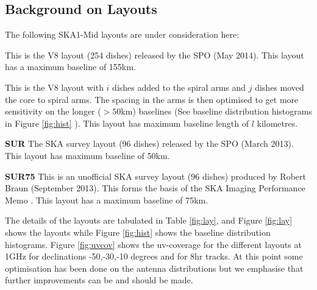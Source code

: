 \documentclass[sfheadings,a4paper,times,9pt,floats,floatfix]{article}
\begin{document}
\subsection{Background on Layouts}\label{sec:layouts}
The following SKA1-Mid layouts are under consideration here:
\begin{description}
\item[{\bf V8B155}] This is the V8 layout (254 dishes) released by the SPO (May 2014). This layout
has a maximum baseline of 155km.
\item[{\bf W8-$i$C$j$B$l$}] This is the V8 layout with $i$ dishes added
to the spiral arms and $j$ dishes moved the core to spiral arms. The spacing in the arms is then optimised  to get
more sensitivity on the longer ($>50$km) baselines (See baseline distribution histograms in Figure \ref{fig:hist} ).
This layout has maximum baseline length of $l$ kilometres.
\item {\bf SUR} The SKA survey layout (96 dishes) released by the SPO (March 2013). This layout
has maximum baseline of 50km. 
\item {\bf SUR75} This is an unofficial SKA survey layout (96 dishes) produced by Robert Braun
(September 2013). This forms the basis of the SKA Imaging Performance Memo \cite{srd}. This layout has a maximum
baseline of 75km.
\end{description}
The details of the layouts are tabulated in Table \ref{fig:lay}, and Figure \ref{fig:lay} shows the layouts while Figure
\ref{fig:hist} shows the baseline distribution histograms. Figure \ref{fig:uvcov} shows the uv-coverage
for the different layouts at 1GHz for declinations -50,-30,-10  degrees and for 8hr tracks. At this point some
optimisation has been done on the antenna distributions but we emphasise that further improvements can be and should be
made.
\end{document}
